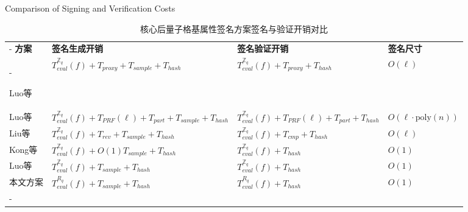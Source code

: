 \begin{table}
	\centering
	\caption{核心后量子格基属性签名方案签名与验证开销对比}{Comparison of Signing and Verification Costs}
	\label{tab:cost_compare}
	\tabulinesep=1.5mm
	\begin{tabu}to \linewidth{X[c,m]X[c,m]X[c,m]X[c,m]}
		\tabucline[0.08em]-
		\textbf{方案} & \textbf{签名生成开销} & \textbf{签名验证开销} & \textbf{签名尺寸} \\
		\tabucline-

		Luo等\cite{luo2021abs}
		& $T^{\mathbb{Z}_q}_{eval}(f)+T_{proxy}+T_{sample}+T_{hash}$
		& $T^{\mathbb{Z}_q}_{eval}(f)+T_{proxy}+T_{hash}$
		& $O(\ell)$ \\

		Luo等\cite{luo2022unbounded}
		& $T^{\mathbb{Z}_q}_{eval}(f)+T_{PRF}(\ell)+T_{part}+T_{sample}+T_{hash}$
		& $T^{\mathbb{Z}_q}_{eval}(f)+T_{PRF}(\ell)+T_{part}+T_{hash}$
		& $O(\ell\cdot \mathrm{poly}(n))$ \\

		Liu等\cite{liu2024revocable}
		& $T^{\mathbb{Z}_q}_{eval}(f)+T_{rev}+T_{sample}+T_{hash}$
		& $T^{\mathbb{Z}_q}_{eval}(f)+T_{cmp}+T_{hash}$
		& $O(\ell)$ \\

		Kong等\cite{kong2024flexible}
		& $T^{\mathbb{Z}_q}_{eval}(f)+O(1)T_{sample}+T_{hash}$
		& $T^{\mathbb{Z}_q}_{eval}(f)+T_{hash}$
		& $O(1)$ \\

		Luo等\cite{luo2026constant}
		& $T^{\mathbb{Z}_q}_{eval}(f)+T_{sample}+T_{hash}$
		& $T^{\mathbb{Z}_q}_{eval}(f)+T_{hash}$
		& \textbf{$O(1)$} \\

		\midrule

		本文方案
		& $T^{R_q}_{eval}(f)+T_{sample}+T_{hash}$
		& $T^{R_q}_{eval}(f)+T_{hash}$
		& \textbf{$O(1)$} \\

		\tabucline[0.08em]-
	\end{tabu}
\end{table}
